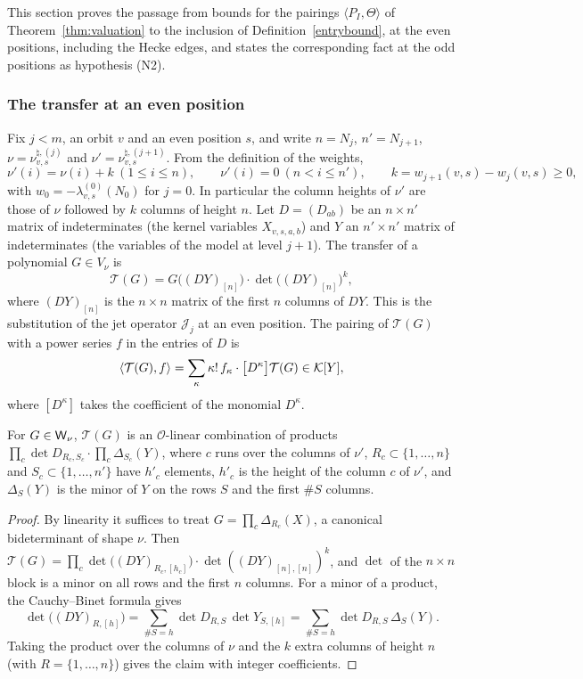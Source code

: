 This section proves the passage from bounds for the pairings $\langle P_I,\Theta\rangle$ of Theorem~\ref{thm:valuation} to the inclusion of Definition~\ref{entrybound}, at the even positions, including the Hecke edges, and states the corresponding fact at the odd positions as hypothesis (N2).

\subsubsection{The transfer at an even position}

Fix $j<m$, an orbit $v$ and an even position $s$, and write $n=N_j$, $n'=N_{j+1}$, $\nu=\nu^{\natural,(j)}_{v,s}$ and $\nu'=\nu^{\natural,(j+1)}_{v,s}$. From the definition of the weights,
\begin{equation}\label{r1:eq:nushift}
\nu'(i)=\nu(i)+k\ (1\le i\le n),\qquad\nu'(i)=0\ (n<i\le n'),\qquad k=w_{j+1}(v,s)-w_j(v,s)\ge0,
\end{equation}
with $w_0=-\lambda^{(0)}_{v,s}(N_0)$ for $j=0$. In particular the column heights of $\nu'$ are those of $\nu$ followed by $k$ columns of height $n$. Let $D=(D_{ab})$ be an $n\times n'$ matrix of indeterminates (the kernel variables $X_{v,s,a,b}$) and $Y$ an $n'\times n'$ matrix of indeterminates (the variables of the model at level $j+1$). The transfer of a polynomial $G\in V_\nu$ is
\[
\mathcal T(G)=G\big((DY)_{[n]}\big)\cdot\det\big((DY)_{[n]}\big)^{k},
\]
where $(DY)_{[n]}$ is the $n\times n$ matrix of the first $n$ columns of $DY$. This is the substitution of the jet operator $\mathcal J_j$ at an even position. The pairing of $\mathcal T(G)$ with a power series $f$ in the entries of $D$ is
\[
\langle\mathcal T(G),f\rangle=\sum_\kappa\kappa!\,f_\kappa\cdot\big[D^\kappa\big]\mathcal T(G)\in\mathcal K[Y],
\]
where $[D^\kappa]$ takes the coefficient of the monomial $D^\kappa$.

\begin{lemma}\label{r1:lem:CB}
For $G\in\mathsf W_\nu$, $\mathcal T(G)$ is an $\mathcal O$-linear combination of products $\prod_c\det D_{R_c,S_c}\cdot\prod_c\Delta_{S_c}(Y)$, where $c$ runs over the columns of $\nu'$, $R_c\subset\{1,\dots,n\}$ and $S_c\subset\{1,\dots,n'\}$ have $h'_c$ elements, $h'_c$ is the height of the column $c$ of $\nu'$, and $\Delta_{S}(Y)$ is the minor of $Y$ on the rows $S$ and the first $\#S$ columns.
\end{lemma}

\begin{proof}
By linearity it suffices to treat $G=\prod_c\Delta_{R_c}(X)$, a canonical bideterminant of shape $\nu$. Then $\mathcal T(G)=\prod_c\det\big((DY)_{R_c,[h_c]}\big)\cdot\det((DY)_{[n],[n]})^k$, and $\det$ of the $n\times n$ block is a minor on all rows and the first $n$ columns. For a minor of a product, the Cauchy--Binet formula gives
\[
\det\big((DY)_{R,[h]}\big)=\sum_{\#S=h}\det D_{R,S}\,\det Y_{S,[h]}=\sum_{\#S=h}\det D_{R,S}\,\Delta_S(Y).
\]
Taking the product over the columns of $\nu$ and the $k$ extra columns of height $n$ (with $R=\{1,\dots,n\}$) gives the claim with integer coefficients.
\end{proof}


